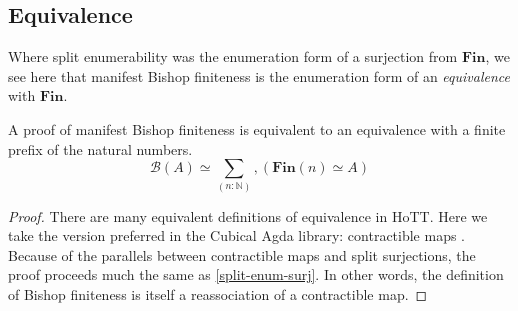 \subsection{Equivalence}
Where split enumerability was the enumeration form of a surjection from
\(\mathbf{Fin}\), we see here that manifest Bishop finiteness is the enumeration
form of an \emph{equivalence} with \(\mathbf{Fin}\).
\begin{rm-lemma} \label{bishop-equiv}
  A proof of manifest Bishop finiteness is equivalent to an equivalence with a
  finite prefix of the natural numbers.
  \begin{equation}
    \mathcal{B}(A) \simeq \sum_{(n : \mathbb{N})} , \left( \mathbf{Fin}(n) \simeq A \right)
  \end{equation}
\end{rm-lemma}
\begin{proof}
  There are many equivalent definitions of equivalence in HoTT.
  Here we take the version preferred in the Cubical Agda library: contractible
  maps \cite{hottbook}.
  Because of the parallels between contractible maps and split surjections,
  the proof proceeds much the same as \ref{split-enum-surj}.
  In other words, the definition of Bishop finiteness is itself a reassociation
  of a contractible map.
\end{proof}
